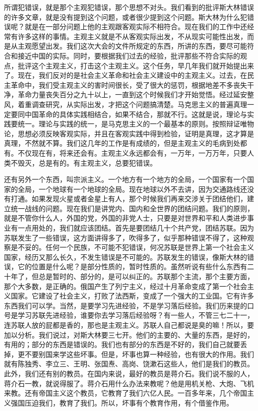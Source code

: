 所谓犯错误，就是那个主观犯错误，那个思想不对头。我们看到的批评斯大林错误的许多文章，就是没有提到这个问题，或者很少提到这个问题。斯大林为什么犯错误呢？就是在一部分问题上他的主观跟客观实际不相符合。现在我们的工作中还经常有许多这样的事情。主观主义就是不从客观实际出发，不从现实可能性出发，而是从主观愿望出发。我们这次大会的文件所规定的东西，所讲的东西，要尽可能符合和接近中国的实际。同时，要根据我们过去的经验，批评那些不符合实际的观点，批评这个主观主义，打击这个主观主义。这个任务，早几年我们就开始提出来了。现在，我们反对的是社会主义革命和社会主义建设中的主观主义。过去，在民主革命中，我们受主观主义的害时间很长，受了很大的惩罚，根据地差不多丧失干净，革命力量丧失百分之九十以上，一直到这个时候我们才开始觉悟。经过延安整风，着重调查研究，从实际出发，才把这个问题搞清楚。马克思主义的普遍真理一定要同中国革命的具体实践相结合，如果不结合，那就不行。这就是说，理论与实践要统一。理论与实践的统一，是马克思主义的一个最基本的原则。按照辩证唯物论，思想必须反映客观实际，并且在客观实践中得到检验，证明是真理，这才算是真理，不然就不算。我们这几年的工作是有成绩的，但是主观主义的毛病到处都有。不仅现在有，将来还会有。主观主义永远都会有，一万年，一万万年，只要人类不毁灭，总是有的。有主观主义，总要犯错误。

还有另外一个东西，叫宗派主义。一个地方有一个地方的全局，一个国家有一个国家的全局，一个地球有一个地球的全局。现在地球以外不去讲，因为交通路线还没有打通。如果发现火星或者金星上有人，那个时候我们再来交涉关于团结他们，建立统一战线的问题。现在我们是讲党内、国内和全世界的团结问题。我们的原则，就是不管你什么人，外国的党，外国的非党人士，只要是对世界和平和人类进步事业有一点用处的，我们就应该团结。首先是要团结几十个共产党，团结苏联。因为苏联发生了一些错误，这方面讲得多了，吹得多了，似乎那种错误不得了，这种观察是不妥的。任何一个民族，不可能不犯错误，何况苏联是世界上第一个社会主义国家，经历又那么长久，不发生错误是不可能的。苏联发生的错误，像斯大林的错误，它的位置是什么呢？是部分性质的，暂时性质的。虽然听说有些什么东西有二十年了，但总是暂时的、部分的，是可以纠正的。苏联那个主流，那个主要方面，那个大多数，是正确的。俄国产生了列宁主义，经过十月革命变成了第一个社会主义国家。它建设了社会主义，打败了法西斯，变成了一个强大的工业国。它有许多东西我们可以学。当然，是要学习先进经验，不是学习落后经验。我们历来提的口号是学习苏联先进经验，谁要你去学习落后经验呀？有一些人，不管三七二十一，连苏联人放的屁都是香的，那也是主观主义。苏联人自己都说是臭的嘛！所以，要加以分析。我们说过，对斯大林要三七开。他们的主要的、大量的东西，是好的，有用的；部分的东西是错误的。我们也有部分的东西是不好的，我们自己就要丢掉，更不要别国来学这些坏事。但是，坏事也算一种经验，也有很大的作用。我们就有陈独秀、李立三、王明、张国焘、高岗、饶漱石这些人，他们是我们的教员。此外，我们还有别的教员。在国内来说，最好的教员是蒋介石。我们说不服的人，蒋介石一教，就说得服了。蒋介石用什么办法来教呢？他是用机关枪、大炮、飞机来教。还有帝国主义这个教员，它教育了我们六亿人民。一百多年来，几个帝国主义强国压迫我们，教育了我们。所以，坏事有个教育作用，有个借鉴作用。

